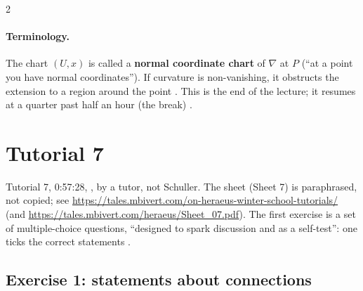 \begin{paracol}{2}
\paragraph{Terminology.} The chart $(U,x)$ is called a \textbf{normal coordinate chart} of $\nabla$ at $P$ (``at a point you have normal coordinates''). If curvature is non-vanishing, it obstructs the extension to a region around the point . This is the end of the lecture; it resumes at a quarter past half an hour (the break) .

\section{Tutorial 7}\label{sec:t07-1}

Tutorial 7, 0:57:28, , by a tutor, not Schuller. The sheet (Sheet 7) is paraphrased, not copied; see \url{https://tales.mbivert.com/on-heraeus-winter-school-tutorials/} (and \url{https://tales.mbivert.com/heraeus/Sheet_07.pdf}). The first exercise is a set of multiple-choice questions, ``designed to spark discussion and as a self-test'': one ticks the correct statements .

\subsection*{Exercise 1: statements about connections}


\end{paracol}
